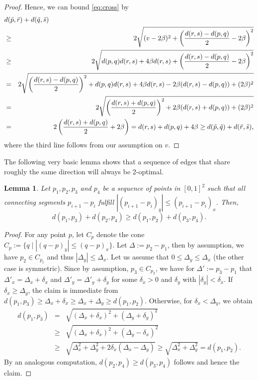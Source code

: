 \documentclass[11pt,DIV=12,a4paper]{scrartcl}
\newtheorem{lemma}[claim]{Lemma}
\begin{document}
\begin{proof}

Hence, we can bound \eqref{eq:cross} by
\begin{eqnarray*}
\lefteqn{d(\tilde{p},\tilde{r}) + d(\tilde{q},\tilde{s})} \\
 & \ge & 2\sqrt{(v-2\beta)^2 + \left(\frac{d(r,s)-d(p,q)}{2}-2\beta\right)^2} \\
& \ge & 2\sqrt{d(p,q)d(r,s) + 4\beta d(r,s) + \left(\frac{d(r,s)-d(p,q)}{2}-2\beta\right)^2} \\
& = & 2\sqrt{\left(\frac{d(r,s)-d(p,q)}{2}\right)^2+d(p,q)d(r,s) + 4\beta d(r,s) - 2\beta(d(r,s)-d(p,q)) + (2\beta)^2} \\
& = & 2\sqrt{\left(\frac{d(r,s)+d(p,q)}{2}\right)^2 + 2\beta (d(r,s) + d(p,q)) + (2\beta)^2} \\
& = & 2 \left(\frac{d(r,s)+d(p,q)}{2} + 2\beta\right) = d(r,s) + d(p,q) + 4\beta \ge d(\tilde{p},\tilde{q}) + d(\tilde{r},\tilde{s}),
\end{eqnarray*}
where the third line follows from our assumption on $v$.
\end{proof}

The following very basic lemma shows that a sequence of edges that share roughly the same direction will always be 2-optimal.

\begin{lemma}\label{lem:45angle}
Let $p_1,p_2,p_3$ and $p_4$ be a sequence of points in $[0,1]^2$ such that all connecting segments $p_{i+1}-p_i$ fulfill $|(p_{i+1} - p_i)_y| \le (p_{i+1} - p_i)_x$. Then,
\[ d(p_1,p_3) + d(p_2,p_4) \ge d(p_1,p_2) + d(p_3, p_4).\]
\end{lemma}
\begin{proof}
For any point $p$, let $C_p$ denote the cone $C_p := \{q \mid |(q-p)_y| \le (q-p)_x\}$. Let $\Delta := p_2 - p_1$, then by assumption, we have $p_2 \in C_{p_1}$ and thus $|\Delta_y| \le \Delta_x$. Let us assume that $0 \le \Delta_y \le \Delta_x$ (the other case is symmetric). Since by assumption, $p_3 \in C_{p_2}$, we have for $\Delta' := p_3 - p_1$ that $\Delta'_x = \Delta_x + \delta_x$ and $\Delta'_y = \Delta'_y + \delta_y$ for some $\delta_x > 0$ and $\delta_y$ with $|\delta_y| < \delta_x$. If $\delta_x \ge \Delta_y$, the claim is immediate from $d(p_1,p_3) \ge \Delta_x + \delta_x \ge \Delta_x+\Delta_y\ge d(p_1,p_2)$. Otherwise, for $\delta_x <\Delta_y$, we obtain
\begin{eqnarray*}
d(p_1, p_3) & = & \sqrt{(\Delta_x+\delta_x)^2 + (\Delta_y+\delta_y)^2} \\
& \ge & \sqrt{(\Delta_x+\delta_x)^2 + (\Delta_y-\delta_x)^2}\\
& \ge & \sqrt{\Delta^2_x + \Delta_y^2 + 2\delta_x(\Delta_x - \Delta_y)} \ge  \sqrt{\Delta^2_x + \Delta_y^2} = d(p_1, p_2).
\end{eqnarray*}
By an analogous computation, $d(p_2,p_4)\ge d(p_3, p_4)$ follows and hence the claim.
\end{proof}
\end{document}
